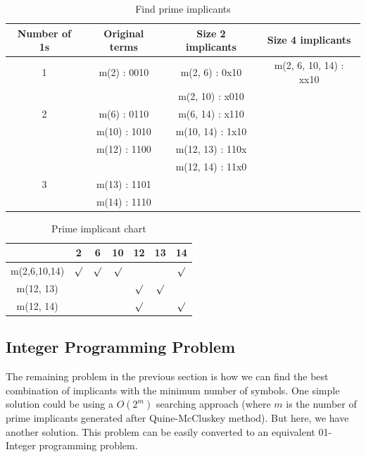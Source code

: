 \documentclass[11pt]{book}
\begin{document}
\begin{table}
	\centering
	
	\begin{tabular}{c|c|c|c}
		\hline
		Number of 1s & Original terms & Size 2 implicants & Size 4 implicants \\
		\hline
		1 &  m(2) : 0010 &   m(2, 6) : 0x10 & m(2, 6, 10, 14) : xx10 \\
		  &              &  m(2, 10) : x010 \\ 
		\hline
		2 &  m(6) : 0110 &  m(6, 14) : x110 \\
		  & m(10) : 1010 & m(10, 14) : 1x10 \\
		  & m(12) : 1100 & m(12, 13) : 110x \\
		  &              & m(12, 14) : 11x0 \\
		\hline
		3 & m(13) : 1101 \\
		  & m(14) : 1110 \\
		\hline
	\end{tabular}
	
	\caption{Find prime implicants}
\end{table}

\begin{table}
	\centering
	
	\begin{tabular}{c|c|c|c|c|c|c}
		\hline
		& 2 & 6 & 10 & 12 & 13 & 14 \\
		\hline
		m(2,6,10,14) & $\surd$ & $\surd$ & $\surd$ &         &         & $\surd$ \\
		m(12, 13)    &         &         &         & $\surd$ & $\surd$ &         \\
		m(12, 14)    &         &         &         & $\surd$ &         & $\surd$ \\
		\hline
	\end{tabular}
	
	\caption{Prime implicant chart}
\end{table}

\subsection{Integer Programming Problem}

The remaining problem in the previous section is how we can find the best combination of implicants with the minimum number of symbols. One simple solution could be using a $O(2^m)$ searching approach (where $m$ is the number of prime implicants generated after Quine-McCluskey method). But here, we have another solution. This problem can be easily converted to an equivalent 01-Integer programming problem.
\end{document}
